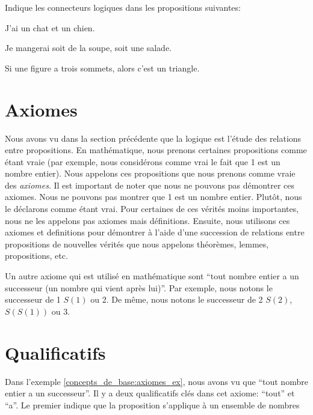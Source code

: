 \begin{exercice}
    Indique les connecteurs logiques dans les propositions suivantes:
    \begin{exerciceenumnoeq}
        \item J'ai un chat et un chien.
        \item Je mangerai soit de la soupe, soit une salade.
        \item Si une figure a trois sommets, alors c'est un triangle.
    \end{exerciceenumnoeq}
\end{exercice}

\section{Axiomes}

Nous avons vu dans la section précédente que la logique est l'étude des relations entre propositions. En mathématique, nous prenons certaines propositions comme étant vraie (par exemple, nous considérons comme vrai le fait que 1 est un nombre entier). Nous appelons ces propositions que nous prenons comme vraie des {\em axiomes}. Il est important de noter que nous ne pouvons pas démontrer ces axiomes. Nous ne pouvons pas montrer que 1 est un nombre entier. Plutôt, nous le déclarons comme étant vrai. Pour certaines de ces vérités moins importantes, nous ne les appelons pas axiomes mais définitions. Ensuite, nous utilisons ces axiomes et definitions pour démontrer à l'aide d'une succession de relations entre propositions de nouvelles vérités que nous appelons théorèmes, lemmes, propositions, etc.

\begin{exemple}\label{concepts_de_base:axiomes_ex}
    Un autre axiome qui est utilisé en mathématique sont ``tout nombre entier a un successeur (un nombre qui vient après lui)''. Par exemple, nous notons le successeur de 1 $S(1)$ ou 2. De même, nous notons le successeur de 2 $S(2)$, $S(S(1))$ ou 3.
\end{exemple}

\section{Qualificatifs}

Dans l'exemple \ref{concepts_de_base:axiomes_ex}, nous avons vu que ``tout nombre entier a un successeur''. Il y a deux qualificatifs clés dans cet axiome: ``tout'' et ``a''. Le premier indique que la proposition s'applique à un ensemble de nombres